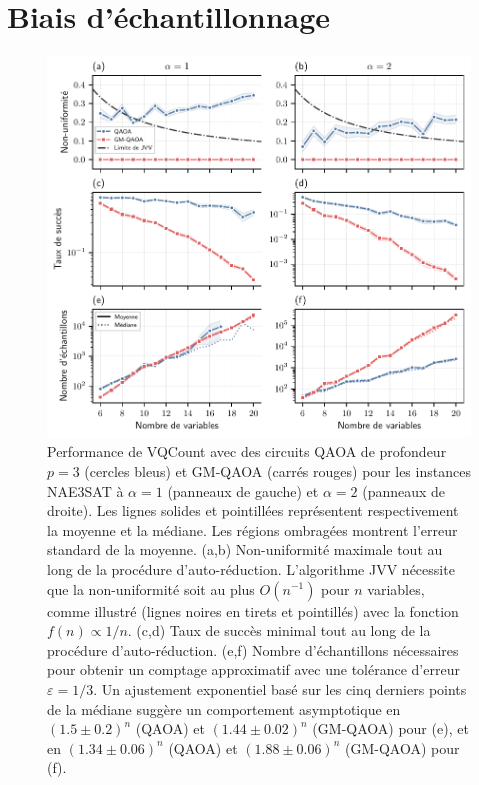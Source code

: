 
\section{Biais d'échantillonnage}
\label{sec:biais-echantillonnage}

\begin{figure}[ht!]
    \centering
    \includegraphics[width=1\textwidth]{figures/nae3sat-nonuniformity.pdf}
    \caption[Biais d'échantillonnage pour \#NAE3SAT]{Performance de VQCount avec des circuits QAOA de profondeur $p=3$ (cercles bleus) et GM-QAOA (carrés rouges) pour les instances NAE3SAT à $\alpha=1$ (panneaux de gauche) et $\alpha=2$ (panneaux de droite). Les lignes solides et pointillées représentent respectivement la moyenne et la médiane. Les régions ombragées montrent l'erreur standard de la moyenne. (a,b) Non-uniformité maximale tout au long de la procédure d'auto-réduction. L'algorithme JVV nécessite que la non-uniformité soit au plus $O(n^{-1})$ pour $n$ variables, comme illustré (lignes noires en tirets et pointillés) avec la fonction $f(n) \propto 1/n$. (c,d) Taux de succès minimal tout au long de la procédure d'auto-réduction. (e,f) Nombre d'échantillons nécessaires pour obtenir un comptage approximatif avec une tolérance d'erreur $\varepsilon = 1/3$. Un ajustement exponentiel basé sur les cinq derniers points de la médiane suggère un comportement asymptotique en $(1.5 \pm 0.2)^n$ (QAOA) et $(1.44 \pm 0.02)^n$ (GM-QAOA) pour (e), et en $(1.34 \pm 0.06)^n$ (QAOA) et $(1.88 \pm 0.06)^n$ (GM-QAOA) pour (f).}
    \label{fig:nae3sat-number-of-samples}
\end{figure}

